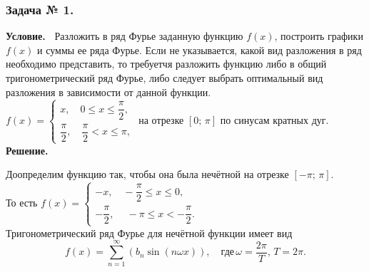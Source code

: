 \subsubsection*{\center Задача № 1.}
{\bf Условие.~}
Разложить в ряд Фурье заданную функцию $f(x)$, построить графики $f(x)$ и суммы ее ряда Фурье. Если не указывается, какой вид разложения в ряд необходимо представить, то требуетчя разложить функцию либо в общий тригонометрический ряд Фурье, либо следует выбрать оптимальный вид разложения в зависимости от данной функции. \\[1cm]

$
f(x)=\left\{
	\begin{array}{r}
	x, \quad0 \leq x \leq \dfrac{\pi}{2}, \\
	\dfrac{\pi}{2}, \quad\dfrac{\pi}{2}<x \leq \pi,
	\end{array}
	\right.
$
на отрезке $[0;\,\pi]$ по синусам кратных дуг.\\    [1cm]
{\bf Решение.~}	
\begin{center}
	\end{center}
\noindent
Доопределим функцию так, чтобы она была нечётной на отрезке $[-\pi;\,\pi]$.\\ [12pt]
То есть 
$
f(x)=\left\{
	\begin{array}{r}
	-x, \quad-\dfrac{\pi}{2} \leq x \leq  0, \\
	-\dfrac{\pi}{2}, \quad\ -\pi \leq x< -\dfrac{\pi}{2}.
	\end{array}
	\right.
$ \\ [12pt]
Тригонометрический ряд Фурье для нечётной функции имеет вид
$$
f(x)=\sum_{n=1}^\infty 
\left(b_n\sin{(n\omega x)}\right),\quad\text{где}\,\omega=\frac{2\pi}{T},\,T=2\pi.
$$
